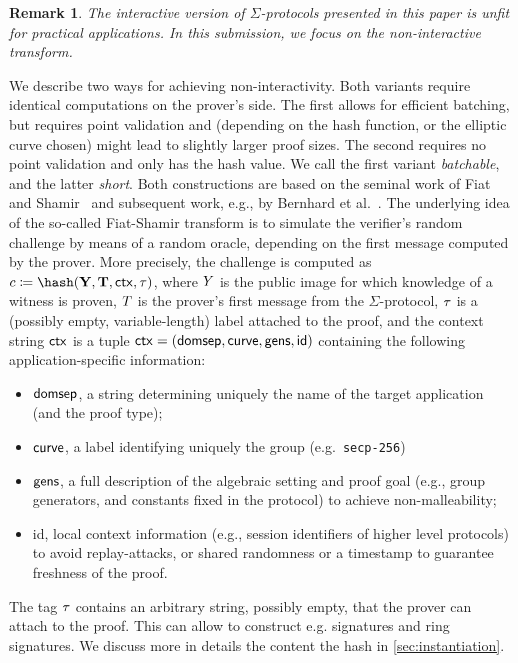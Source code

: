 \documentclass[runningheads,11pt]{article}
\newtheorem{remark}{Remark}
\begin{document}
\begin{remark}
The interactive version of $\Sigma$-protocols presented in this paper is unfit for practical applications.
 In this submission, we focus on the non-interactive transform.
\end{remark}


We describe two ways for achieving non-interactivity. Both variants require identical computations on the prover's side.
The first allows for efficient batching, but requires point validation and (depending on the hash function, or the elliptic curve chosen) might lead to
slightly larger proof sizes. The second requires no point validation and only has the hash value.
We call the first variant \emph{batchable}, and the latter \emph{short}.
Both constructions are based on the seminal work of Fiat and Shamir~\cite{C:FiaSha86} and subsequent work, e.g., by Bernhard et al.~\cite{AC:BerPerWar12}.
The underlying idea of the so-called Fiat-Shamir transform is to simulate the verifier's random challenge by means of a random oracle, depending on the first message computed by the prover.
More precisely, the challenge is computed as
$c\defeq\hash(\vec \statement,\vec \commitment, \ctx, \stag)$,
where $Y$ is the public image for which knowledge of a witness is proven, $T$ is the prover's first message from the $\Sigma$-protocol, $\tau$ is a (possibly empty, variable-length) label attached to the proof, and
the context string $\mathsf{ctx}$ is a tuple $\mathsf{ctx} = (\textsf{domsep}, \textsf{curve}, \textsf{gens}, \textsf{id})$ containing the following application-specific information:
\begin{itemize}
  \item $\textsf{domsep}$, a string determining uniquely the name of the target application (and the proof type);
  \item $\textsf{curve}$, a label identifying uniquely the group (e.g.\ \verb|secp-256|)
  \item $\textsf{gens}$,
    a full description of the algebraic setting and proof goal (e.g., group generators, and constants fixed in the protocol) to achieve non-malleability;
  \item \textsf{id},
    local context information (e.g., session identifiers of higher level protocols) to avoid replay-attacks, or shared randomness or a timestamp to guarantee freshness of the proof.
\end{itemize}
The tag $\tau$ contains an arbitrary string, possibly empty, that the prover can attach to the proof. This can allow to construct e.g. signatures and ring signatures.
We discuss more in details the content the hash in \cref{sec:instantiation}.
\end{document}
